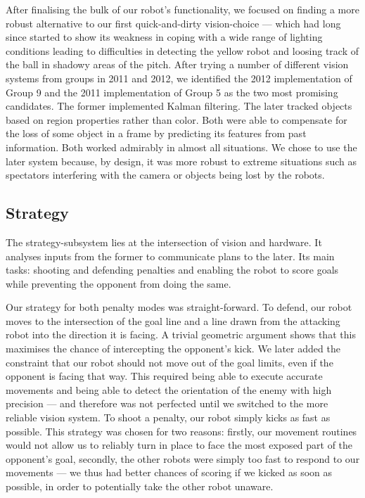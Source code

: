 \documentclass[journal,a4paper,12pt]{IEEEtran}
\begin{document}
After finalising the bulk of our robot's functionality, we focused on finding a more robust alternative to our first quick-and-dirty vision-choice --- which had long since started to show its weakness in coping with a wide range of lighting conditions leading to difficulties in detecting the yellow robot and loosing track of the ball in shadowy areas of the pitch. After trying a number of different vision systems from groups in 2011 and 2012, we identified the 2012 implementation of Group 9 and the 2011 implementation of Group 5 as the two most promising candidates. The former implemented Kalman filtering. The later tracked objects based on region properties rather than color. Both were able to compensate for the loss of some object in a frame by predicting its features from past information. Both worked admirably in almost all situations. We chose to use the later system because, by design, it was more robust to extreme situations such as spectators interfering with the camera or objects being lost by the robots.


\subsection{Strategy}\label{s:strategy}

The strategy-subsystem lies at the intersection of vision and hardware. It analyses inputs from the former to communicate plans to the later. Its main tasks: shooting and defending penalties and enabling the robot to score goals while preventing the opponent from doing the same.

Our strategy for both penalty modes was straight-forward. To defend, our robot moves to the intersection of the goal line and a line drawn from the attacking robot into the direction it is facing. A trivial geometric argument shows that this maximises the chance of intercepting the opponent's kick. We later added the constraint that our robot should not move out of the goal limits, even if the opponent is facing that way. This required being able to execute accurate movements and being able to detect the orientation of the enemy with high precision --- and therefore was not perfected until we switched to the more reliable vision system. To shoot a penalty, our robot simply kicks as fast as possible. This strategy was chosen for two reasons: firstly, our movement routines would not allow us to reliably turn in place to face the most exposed part of the opponent's goal, secondly, the other robots were simply too fast to respond to our movements --- we thus had better chances of scoring if we kicked as soon as possible, in order to potentially take the other robot unaware.
\end{document}
